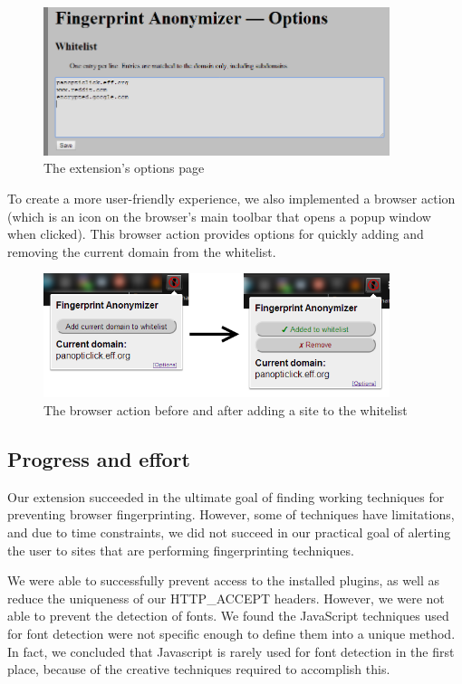 \documentclass[12pt,a4paper]{article}
\begin{document}
\begin{figure}[ht]
  \centering
      \includegraphics[width=0.9\textwidth]{options.png}
  \caption{The extension's options page}
\end{figure}

To create a more user-friendly experience, we also implemented a browser action (which is an icon on the browser's main toolbar that opens a popup window when clicked). This browser action provides options for quickly adding and removing the current domain from the whitelist.

\begin{figure}[ht]
  \centering
      \includegraphics[width=0.9\textwidth]{browser-action.png}
  \caption{The browser action before and after adding a site to the whitelist}
\end{figure}

\subsection{Progress and effort}
Our extension succeeded in the ultimate goal of finding working techniques for preventing browser fingerprinting. However, some of techniques have limitations, and due to time constraints, we did not succeed in our practical goal of alerting the user to sites that are performing fingerprinting techniques.

We were able to successfully prevent access to the installed plugins, as well as reduce the uniqueness of our HTTP\_ACCEPT headers. However, we were not able to prevent the detection of fonts. We found the JavaScript techniques used for font detection were not specific enough to define them into a unique method. In fact, we concluded that Javascript is rarely used for font detection in the first place, because of the creative techniques required to accomplish this.
\end{document}
